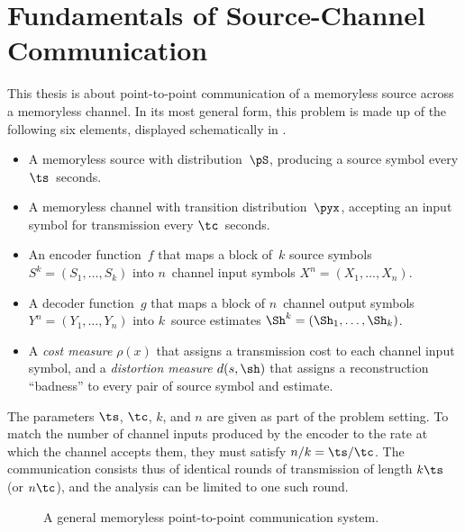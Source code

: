 \chapter{Fundamentals of Source-Channel Communication}\label{ch:fundamentals}

This thesis is about point-to-point communication of a memoryless source across
a memoryless channel. In its most general form, this problem is made up of the
following six elements, displayed schematically in .
\begin{itemize}
  \item A memoryless source with distribution~$\pS$, producing a source symbol
    every $\ts$~seconds.
  \item A memoryless channel with transition distribution~$\pyx$, accepting an
    input symbol for transmission every $\tc$~seconds.
  \item An encoder function~$f$ that maps a block of~$k$ source symbols $S^k
    = (S_1, \dots, S_k)$ into $n$~channel input symbols $X^n = (X_1,
    \dots, X_n)$.
  \item A decoder function~$g$ that maps a block of $n$~channel output symbols
    $Y^n = (Y_1, \dots, Y_n)$ into $k$~source estimates $\Sh^k = (\Sh_1,
    \dots, \Sh_k)$.
  \item A \emph{cost measure} $\rho(x)$ that assigns a transmission cost to each
    channel input symbol, and a \emph{distortion measure} $d(s,\sh)$ that
    assigns a reconstruction ``badness'' to every pair of source symbol and
    estimate.
\end{itemize}
The parameters $\ts$, $\tc$, $k$, and $n$ are given as part of the problem
setting. To match the number of channel inputs produced by the encoder to the
rate at which the channel accepts them, they must satisfy $n/k = \ts / \tc$. The
communication consists thus of identical rounds of transmission of length $k\ts$
(or $n\tc$), and the analysis can be limited to one such round.


\begin{figure}
  \begin{center}
    
  \end{center}
  \caption{A general memoryless point-to-point communication system.}
  \label{fig:scgen}
\end{figure}

